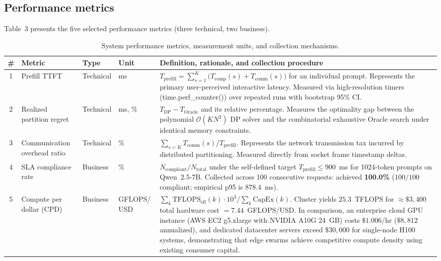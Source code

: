 \documentclass[10pt,a4paper]{article}
\newcommand{\code}[1]{{\ttfamily\footnotesize #1}}
\begin{document}
\subsection{Performance metrics}
Table~3 presents the five selected performance metrics (three technical, two business).

\begin{table}[H]
\centering\footnotesize
\caption{System performance metrics, measurement units, and collection mechanisms.}
\begin{tabularx}{\textwidth}{@{}c p{2.2cm} p{1.3cm} p{1.8cm} Y@{}}
\toprule
\# & Metric & Type & Unit & Definition, rationale, and collection procedure\\
 & Prefill TTFT & Technical & ms & $T_{\text{prefill}}=\sum_{s=1}^{K}\big(T_{\text{comp}}(s)+T_{\text{comm}}(s)\big)$ for an individual prompt. Represents the primary user-perceived interactive latency. Measured via high-resolution timers (\code{time.perf\_counter()}) over repeated runs with bootstrap 95\% CI.\\
2 & Realized partition regret & Technical & ms, \% & $T_{\text{DP}}-T_{\text{Oracle}}$ and its relative percentage. Measures the optimality gap between the polynomial $\mathcal{O}(KN^2)$ DP solver and the combinatorial exhaustive Oracle search under identical memory constraints.\\
3 & Communication overhead ratio & Technical & \% & $\sum_{s<K}T_{\text{comm}}(s)/T_{\text{prefill}}$. Represents the network transmission tax incurred by distributed partitioning. Measured directly from socket frame timestamp deltas.\\
4 & SLA compliance rate & Business & \% & $N_{\text{compliant}}/N_{\text{total}}$ under the self-defined target $T_{\text{prefill}}\le 900$~ms for 1024-token prompts on Qwen~2.5-7B. Collected across 100 consecutive requests: achieved \textbf{100.0\%} ($100/100$ compliant; empirical p95 is $878.4$~ms).\\
5 & Compute per dollar (CPD) & Business & GFLOPS/ USD & $\sum_k \text{TFLOPS}_{\text{eff}}(k)\cdot10^3/\sum_k \text{CapEx}(k)$. Cluster yields $25.3$~TFLOPS for $\approx \$3{,}400$ total hardware cost $= \mathbf{7.44}$~GFLOPS/USD. In comparison, an enterprise cloud GPU instance (AWS EC2 \code{g5.xlarge} with NVIDIA A10G 24~GB) costs $\$1.006$/hr ($\$8{,}812$ annualized), and dedicated datacenter servers exceed $\$30{,}000$ for single-node H100 systems, demonstrating that edge swarms achieve competitive compute density using existing consumer capital.\\
\bottomrule
\end{tabularx}
\end{table}
\end{document}
